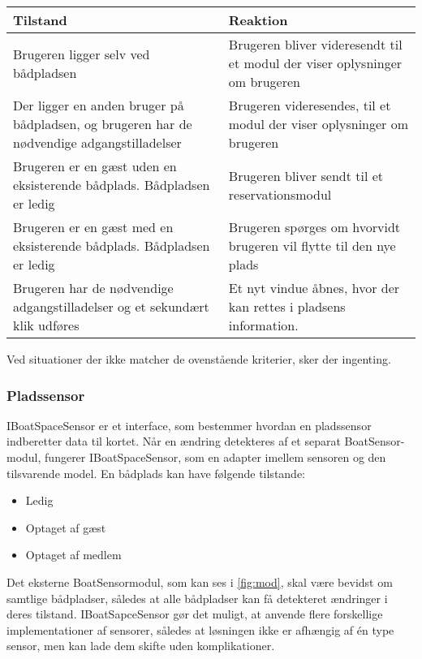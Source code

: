 \begin{tabu} to \textwidth {XX}
  \toprule
  \textbf{Tilstand} & \textbf{Reaktion} \\
   \midrule
   Brugeren ligger selv ved bådpladsen & Brugeren bliver videresendt til et modul der viser oplysninger om brugeren \\
   \midrule
  Der ligger en anden bruger på bådpladsen, og brugeren har de nødvendige adgangstilladelser & Brugeren videresendes, til et modul der viser oplysninger om brugeren \\
  \midrule
   Brugeren er en gæst uden en eksisterende bådplads. Bådpladsen er ledig & Brugeren bliver sendt til et reservationsmodul \\ 
   \midrule
   Brugeren er en gæst med en eksisterende bådplads. Bådpladsen er ledig & Brugeren spørges om hvorvidt brugeren vil flytte til den nye plads \\
   \midrule
   Brugeren har de nødvendige adgangstilladelser og et sekundært klik udføres & Et nyt vindue åbnes, hvor der kan rettes i pladsens information. \\
   \bottomrule 
\end{tabu}
Ved situationer der ikke matcher de ovenstående kriterier, sker der ingenting.


\subsubsection{Pladssensor}
\label{sub:map_sensor_interface}

IBoatSpaceSensor er et interface, som bestemmer hvordan en pladssensor indberetter data til kortet. Når en ændring detekteres af et separat BoatSensor-modul, fungerer IBoatSpaceSensor, som en adapter imellem sensoren og den tilsvarende model. En bådplads kan have følgende tilstande:

\begin{itemize}
  \item Ledig
  \item Optaget af gæst
  \item Optaget af medlem
\end{itemize}

Det eksterne BoatSensormodul, som kan ses i \cref{fig:mod}, skal være bevidst om samtlige bådpladser, således at alle bådpladser kan få detekteret ændringer i deres tilstand. IBoatSapceSensor gør det muligt, at anvende flere forskellige implementationer af sensorer, således at løsningen ikke er afhængig af én type sensor, men kan lade dem skifte uden komplikationer.



